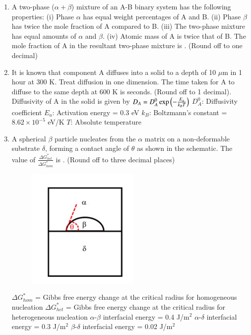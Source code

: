 \documentclass[a4paper,10pt]{article}
\begin{document}
\begin{enumerate}
\item A two-phase ($\alpha + \beta$) mixture of an A-B binary system has the following properties:
(i) Phase $\alpha$ has equal weight percentages of A and B.
(ii) Phase $\beta$ has twice the mole fraction of A compared to B.
(iii) The two-phase mixture has equal amounts of $\alpha$ and $\beta$.
(iv) Atomic mass of A is twice that of B.
The mole fraction of A in the resultant two-phase mixture is \underline{\hspace{2cm}}.
(Round off to one decimal)

\hfill{}

\item It is known that component A diffuses into a solid to a depth of 10 $\mu$m in 1 hour at 300 K. Treat diffusion in one dimension. The time taken for A to diffuse to the same depth at 600 K is \underline{\hspace{2cm}} seconds. (Round off to 1 decimal).
Diffusivity of A in the solid is given by
$D_A = D_A^0 \exp\left(-\frac{E_a}{k_B T}\right)$
$D_A^0$: Diffusivity coefficient
$E_a$: Activation energy = 0.3 eV
$k_B$: Boltzmann's constant = $8.62 \times 10^{-5}$ eV/K
$T$: Absolute temperature

\hfill{}

\item A spherical $\beta$ particle nucleates from the $\alpha$ matrix on a non-deformable substrate $\delta$, forming a contact angle of $\theta$ as shown in the schematic.
The value of $\frac{\Delta G_{het}^*}{\Delta G_{hom}^*}$ is \underline{\hspace{2cm}}. (Round off to three decimal places)
\begin{figure}[H]
    \centering
    \includegraphics[width=0.3\columnwidth]{q62.png}
    \caption*{}
    \label{fig:q62}
\end{figure}
$\Delta G_{hom}^*$ = Gibbs free energy change at the critical radius for homogeneous nucleation
$\Delta G_{het}^*$ = Gibbs free energy change at the critical radius for heterogeneous nucleation
$\alpha$-$\beta$ interfacial energy = 0.4 J/m$^2$
$\alpha$-$\delta$ interfacial energy = 0.3 J/m$^2$
$\beta$-$\delta$ interfacial energy = 0.02 J/m$^2$


\end{enumerate}
\end{document}
